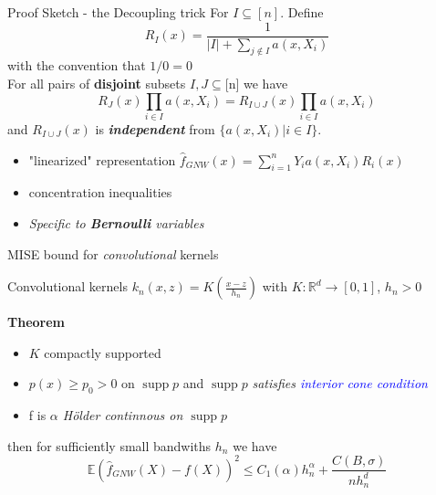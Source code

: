 \documentclass[final,dvipsnames]{beamer}
\makeatletter
\newcommand{\myemph}[1]{\textcolor{blue}{#1}}
\newcommand{\mycolbackwhite}[1]{
\hspace*{.01\linewidth}\begin{minipage}{.96\linewidth}
\begin{mdframed}[backgroundcolor=white!10,linewidth=3pt]
\vspace{10pt}
#1
\vspace{10pt}
\end{mdframed}
\end{minipage}
}
\newcommand*{\rom}[1]{\expandafter\@slowromancap\romannumeral #1@}
\DeclareMathOperator\supp{supp}
\makeatother
\begin{document}
\begin{frame}
\begin{columns}[T]
\begin{column}{0.49\textwidth}
\begin{block}{Proof Sketch - the Decoupling trick
    \hspace*{\fill}{\large{\rom{4}}\qquad}}
   \small For $I\subseteq [n]$. Define %
    \small \begin{equation*}
        R_I(x)=
        \frac{1}{|I|+\sum_{j\notin I}a(x,X_i)}
    \end{equation*}
    \small with the convention that $1/0=0$
    \\
    \vspace{10pt}
    \small For all pairs of \textbf{disjoint} subsets $I,J\subseteq$[n] we have
    \begin{equation*}    
    R_J(x)\prod_{i\in I}a(x,X_i)=R_{I\cup J}(x)\prod_{i\in I}a(x,X_i)
    \end{equation*}
    \small and $R_{I\cup J}(x)$ is \textbf{\textit{independent}} from $\{a(x,X_i)|i\in I\}$.
    \vspace{20pt}
    \begin{itemize}
        \small \item "linearized" representation 
     $\hat{f}_{GNW}(x)=\sum_{i=1}^nY_ia(x,X_i)R_i(x)$ 
        \small \item concentration inequalities
        \small \item \textit{Specific to \textbf{Bernoulli} variables}
    \end{itemize}
\end{block}
\begin{block}{MISE bound for \textit{convolutional} kernels

    \hspace*{\fill}{\large{\rom{5}}\qquad}}
    Convolutional kernels $k_n(x,z)=K(\frac{x-z}{h_n})$ with $K\colon\mathbb{R}^d\to [0,1]$, $h_n>0$
    \vspace{10pt}
    \mycolbackwhite{\textbf{Theorem}
    \vspace{10pt}
    \begin{itemize}
        \item $K$ compactly supported 
        \item $p(x)\geq p_0>0$ on $\supp{p}$ and $\supp{p}$ \textit{satisfies \myemph{interior cone condition}}
        \item f is \textit{$\alpha$ Hölder continnous on $\supp{p}$}
    \end{itemize}
    then for sufficiently small bandwiths $h_n$ we have
        \begin{equation*}
            \mathbb{E}(\hat{f}_{GNW}(X)-f(X))^2\leq C_1(\alpha)h_n^{\alpha}+\frac{C(B,\sigma)}{nh_n^d}
        \end{equation*}}
\end{block}



\end{column}
\end{columns}
\end{frame}
\end{document}
